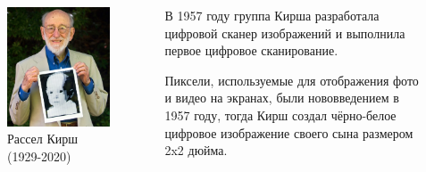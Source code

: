 \documentclass[10pt]{beamer}
\begin{document}
{
	\begin{columns}
		\begin{column}{0.4\textwidth}
			\begin{figure}
				\centering
				\includegraphics[width=1\textwidth]{Screenshot 2024-02-11 140345.png}
				\caption{\centering Рассел Кирш (1929-2020) }
			\end{figure}
		\end{column}
		\begin{column}{0.6\textwidth}
			В 1957 году группа Кирша разработала цифровой сканер изображений и выполнила первое цифровое сканирование.
			
			Пиксели, используемые для отображения фото и видео на экранах, были нововведением в 1957 году, тогда Кирш создал чёрно-белое цифровое изображение своего сына размером 2x2 дюйма.
		\end{column}
	\end{columns}
}
\end{document}

